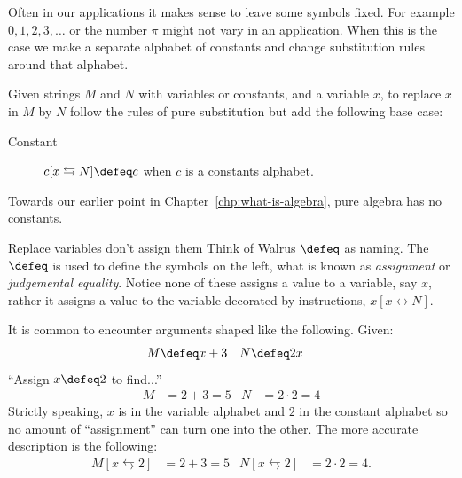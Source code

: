 Often in our applications it makes sense to leave some symbols fixed.
For example $0,1,2,3,\ldots$ or the number $\pi$ might not vary in an application.
When this is the case we make a separate alphabet of constants and change substitution 
rules around that alphabet.
\begin{definition}
    Given strings $M$ and $N$ with variables or constants, 
    and a variable $x$, to replace $x$ in $M$ by $N$ 
    follow the rules of pure substitution but add the following  base case:
    \begin{description}
        \item[Constant] $c[x\leftrightarrows N]\defeq c$ when $c$ is a constants alphabet. 
    \end{description}
\end{definition}

Towards our earlier point in Chapter~\ref{chp:what-is-algebra}, pure algebra has no constants.

\begin{remark}{Replace variables don't assign them}
    Think of Walrus $\defeq$ as  naming.
    The $\defeq$ is used to define the symbols on the left, what is 
    known as \emph{assignment} or \emph{judgemental equality}.  Notice none of 
    these assigns a value to a variable, say $x$, rather it assigns a value to the variable 
    decorated by instructions, $x[x\leftrightarrow N]$.  
    
    It is common to encounter arguments shaped like the following.  Given:
    \begin{align*}
        M & \defeq x+3 & N & \defeq 2x
    \end{align*}
    ``Assign $x \defeq 2$ to find...''
    \begin{align*}
        M  & = 2+3 =5 & N & = 2\cdot 2 =4
    \end{align*}
    Strictly speaking, $x$ is in the variable alphabet and $2$ in the constant 
    alphabet so no amount of ``assignment'' can turn one into the other.
    The more accurate description is the following:
    \begin{align*}
        M[x\leftrightarrows 2] & = 2+3=5 & N[x\leftrightarrows 2] & = 2\cdot 2=4.
    \end{align*}
\end{remark}